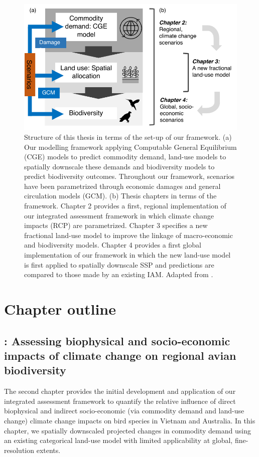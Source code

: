 \begin{figure}[htb]
  \centering
    \includegraphics{chapters/figures/chapter1/fig_structure.pdf}
    \caption{Structure of this thesis in terms of the set-up of our framework. (a) Our modelling framework applying Computable General Equilibrium (CGE) models to predict commodity demand, land-use models to spatially downscale these demands and biodiversity models to predict biodiversity outcomes. Throughout our framework, scenarios have been parametrized through economic damages and general circulation models (GCM). (b) Thesis chapters in terms of the framework. Chapter 2 provides a first, regional implementation of our integrated assessment framework in which climate change impacts (RCP) are parametrized. Chapter 3 specifies a new fractional land-use model to improve the linkage of macro-economic and biodiversity models. Chapter 4 provides a first global implementation of our framework in which the new land-use model is first applied to spatially downscale SSP and predictions are compared to those made by an existing IAM. Adapted from \citet{kapitza_assessing_2021}.}
    \label{ch4:fig_structure}
\end{figure}

\section{Chapter outline}

\subsection*{: Assessing biophysical and socio-economic impacts of climate change on regional avian biodiversity}

The second chapter provides the initial development and application of our integrated assessment framework to quantify the relative influence of direct biophysical and indirect socio-economic (via commodity demand and land-use change) climate change impacts on bird species in Vietnam and Australia. In this chapter, we spatially downscaled projected changes in commodity demand using an existing categorical land-use model with limited applicability at global, fine-resolution extents.


